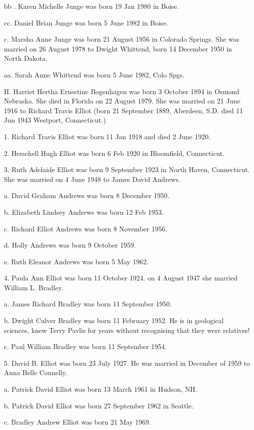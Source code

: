 \documentclass[a4paper]{article}
\begin{document}
bb . Karen Michelle Junge was born 19 Jan 1980  in Boise.
				
cc. Daniel Brian Junge was born 5 June 1982 in Boise.

c. Marsha Anne Junge was born 21 August 1956 in Colorado Springs. She was married on 26 August 1978 to Dwight Whittend, born 14 December 1950 in North Dakota.

aa.  Sarah Anne Whittend was born 5 June 1982, Colo Spgs.

H. Harriet Hertha Ernestine Bogenhagen was born 3 October 1894 in Osmond Nebraska. She died in Florida on 22 August 1979.  She was married on 21 June 1916 to Richard Travis Elliot (born 21 September 1889, Aberdeen, S.D. died 11 Jun 1943 Westport, Connecticut.)

1. Richard Travis Elliot was born 11 Jan 1918 and died 2 June 1920.

2. Herschell Hugh Elliot was born 6 Feb 1920 in Bloomfield, Connecticut.

3. Ruth Adelaide Elliot was born 9 September 1923 in North Haven, Connecticut. She was married on 4 June 1948 to James David Andrews.
 
a. David Graham Andrews was born 8 December 1950.

b. Elizabeth Lindsey Andrews was born 12 Feb 1953.

c. Richard Elliot Andrews was born 8 November 1956.

d. Holly Andrews was born 9 October 1959.

e. Ruth Eleanor Andrews was born 5 May 1962.

4. Paula Ann Elliot was born 11 October 1924.  on 4 August 1947 she married William L. Bradley.

a. James Richard Bradley was born 11 September 1950.

b. Dwight Culver Bradley was born 11 February 1952.  He is in geological sciences,  knew Terry Pavlis for years without recognising that they were relatives!

c. Paul William Bradley was born 11 September 1954.

5. David B. Elliot was born 23 July 1927.  He was married in December of 1959 to Anna Belle Connelly.

a. Patrick David Elliot was born 13 March 1961 in Hudson, NH.

b. Patrick David Elliot was born 27 September 1962 in Seattle.

c. Bradley Andrew Elliot was born 21 May 1969.
\end{document}
